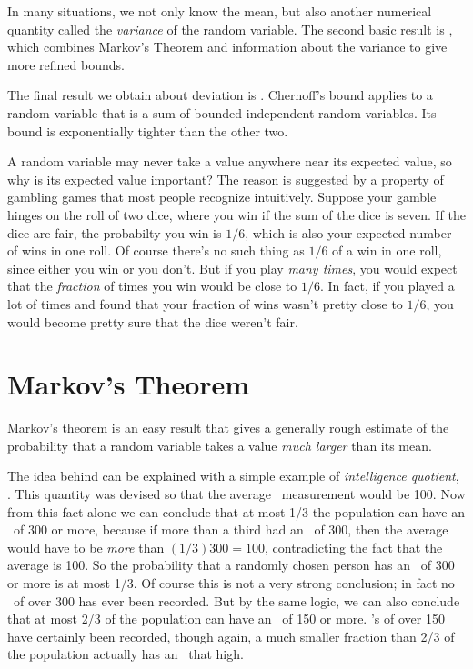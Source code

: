 In many situations, we not only know the mean, but also another numerical
quantity called the \emph{variance} of the random variable.  The second
basic result is , which combines Markov's Theorem and
information about the variance to give more refined bounds.

The final result we obtain about deviation is .
Chernoff's bound applies to a random variable that is a sum of bounded
independent random variables.  Its bound is exponentially tighter than
the other two.

\begin{editingnotes}
A random variable may never take a value anywhere near its expected value,
so why is its expected value important?  The reason is suggested by a
property of gambling games that most people recognize intuitively.
Suppose your gamble hinges on the roll of two dice, where you win if the
sum of the dice is seven.  If the dice are fair, the probabilty you win is
$1/6$, which is also your expected number of wins in one roll.  Of course
there's no such thing as $1/6$ of a win in one roll, since either you win
or you don't.  But if you play \emph{many times}, you would expect that
the \emph{fraction} of times you win would be close to $1/6$.  In fact, if
you played a lot of times and found that your fraction of wins wasn't
pretty close to $1/6$, you would become pretty sure that the dice weren't
fair.
\end{editingnotes}


\section{Markov's Theorem}

Markov's theorem is an easy result that gives a generally rough estimate
of the probability that a random variable takes a value \emph{much larger}
than its mean.

The idea behind  can be explained with a simple
example of \emph{intelligence quotient}, \idx{\IQ}.  This quantity was
devised so that the average \IQ\ measurement would be 100.  Now from this
fact alone we can conclude that at most 1/3 the population can have an
\IQ\ of 300 or more, because if more than a third had an \IQ\ of 300, then
the average would have to be \emph{more} than $(1/3)300 = 100$,
contradicting the fact that the average is 100.  So the probability that a
randomly chosen person has an \IQ\ of 300 or more is at most 1/3.  Of
course this is not a very strong conclusion; in fact no \IQ\ of over 300
has ever been recorded.  But by the same logic, we can also conclude that
at most 2/3 of the population can have an \IQ\ of 150 or more.  \IQ's of
over 150 have certainly been recorded, though again, a much smaller
fraction than 2/3 of the population actually has an \IQ\ that high.

